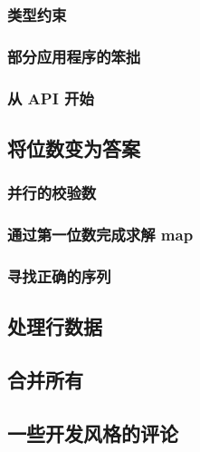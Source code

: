 \documentclass[./main.tex]{subfiles}
\begin{document}
\subsubsection*{类型约束}

\subsubsection*{部分应用程序的笨拙}

\subsubsection*{从 API 开始}

\subsection*{将位数变为答案}

\subsubsection*{并行的校验数}

\subsubsection*{通过第一位数完成求解 map}

\subsubsection*{寻找正确的序列}

\subsection*{处理行数据}

\subsection*{合并所有}

\subsection*{一些开发风格的评论}
\end{document}
